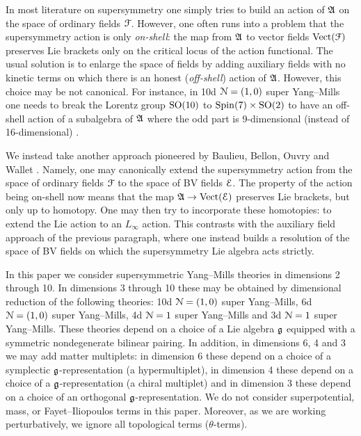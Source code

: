 \documentclass[10pt, oneside]{article}
\begin{document}
In most literature on supersymmetry one simply tries to build an action of $\mathfrak A$ on the space of ordinary fields $\mathcal F$. However, one often runs into a problem that the supersymmetry action is only \emph{on-shell}: the map from $\mathfrak A$ to vector fields $\mathrm{Vect}(\mathcal F)$ preserves Lie brackets only on the critical locus of the action functional. The usual solution is to enlarge the space of fields by adding auxiliary fields with no kinetic terms on which there is an honest (\emph{off-shell}) action of $\mathfrak A$. However, this choice may be not canonical. For instance, in 10d $\mathcal N=(1, 0)$ super Yang--Mills one needs to break the Lorentz group $\mathrm{SO}(10)$ to $\mathrm{Spin}(7)\times\mathrm{SO}(2)$ to have an off-shell action of a subalgebra of $\mathfrak A$ where the odd part is 9-dimensional (instead of 16-dimensional) \cite{BaulieuBerkovitsBossardMartin}.

We instead take another approach pioneered by Baulieu, Bellon, Ouvry and Wallet \cite{BaulieuBV}. Namely, one may canonically extend the supersymmetry action from the space of ordinary fields $\mathcal F$ to the space of BV fields $\mathcal E$. The property of the action being on-shell now means that the map $\mathfrak A\rightarrow \mathrm{Vect}(\mathcal E)$ preserves Lie brackets, but only up to homotopy. One may then try to incorporate these homotopies: to extend the Lie action to an $L_\infty$ action.  This contrasts with the auxiliary field approach of the previous paragraph, where one instead builds a resolution of the space of BV fields on which the supersymmetry Lie algebra acts strictly.

In this paper we consider supersymmetric Yang--Mills theories in dimensions 2 through 10. In dimensions 3 through 10 these may be obtained by dimensional reduction of the following theories: 10d $\mathcal N=(1, 0)$ super Yang--Mills, 6d $\mathcal N=(1, 0)$ super Yang--Mills, 4d $\mathcal N=1$ super Yang--Mills and 3d $\mathcal N=1$ super Yang--Mills. These theories depend on a choice of a Lie algebra $\mathfrak g$ equipped with a symmetric nondegenerate bilinear pairing. In addition, in dimensions 6, 4 and 3 we may add matter multiplets: in dimension 6 these depend on a choice of a symplectic $\mathfrak g$-representation (a hypermultiplet), in dimension 4 these depend on a choice of a $\mathfrak g$-representation (a chiral multiplet) and in dimension 3 these depend on a choice of an orthogonal $\mathfrak g$-representation. We do not consider superpotential, mass, or Fayet--Iliopoulos terms in this paper. Moreover, as we are working perturbatively, we ignore all topological terms ($\theta$-terms).
\end{document}
